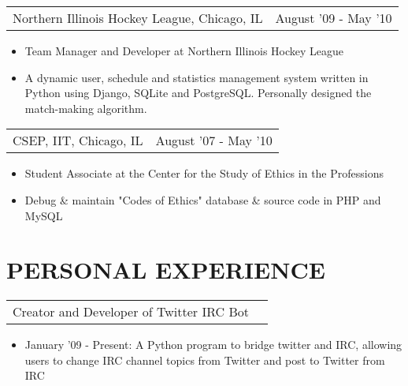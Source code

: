 \documentclass[margin, line]{res}
\begin{document}
\begin{resume}
\begin{tabular}{p{3in} r}
	Northern Illinois Hockey League, Chicago, IL & August '09  - May '10 
\end{tabular}
	\begin{itemize} \itemsep -2pt
		\item[] Team Manager and Developer at Northern Illinois Hockey League
		\item[] A dynamic user, schedule and statistics management system written in Python using Django, SQLite and PostgreSQL. Personally designed the match-making algorithm.
	\end{itemize}

\begin{tabular}{p{3in} r} %
	CSEP, IIT, Chicago, IL & August '07 - May '10
\end{tabular}
	\begin{itemize}  \itemsep -2pt%
		\item[] Student Associate at the Center for the Study of Ethics in the Professions
		\item[] Debug \& maintain "Codes of Ethics" database \& source code in PHP and MySQL
	\end{itemize}
	
\begin{comment}
\begin{tabular}{p{3in} r} %
	Software Engineering Term Project, Chicago, IL &  August '09 - December '09
\end{tabular}
	\begin{itemize}  \itemsep -2pt%
		\item[] Team Leader, Designer and Developer for course CS 485
		\item[] A dynamic user, purchase, and product management prototype application written in PHP using CakePHP and MySQL
	\end{itemize}
\end{comment}

\section{PERSONAL EXPERIENCE}

\begin{tabular}{p{3in} r}
	Creator and Developer of Twitter IRC Bot
\end{tabular}	
	\begin{itemize} \itemsep -2pt
		\item[] January '09 - Present: A Python program to bridge twitter and IRC, allowing users to change IRC channel topics from Twitter and post to Twitter from IRC
	\end{itemize}


\end{resume}
\end{document}

